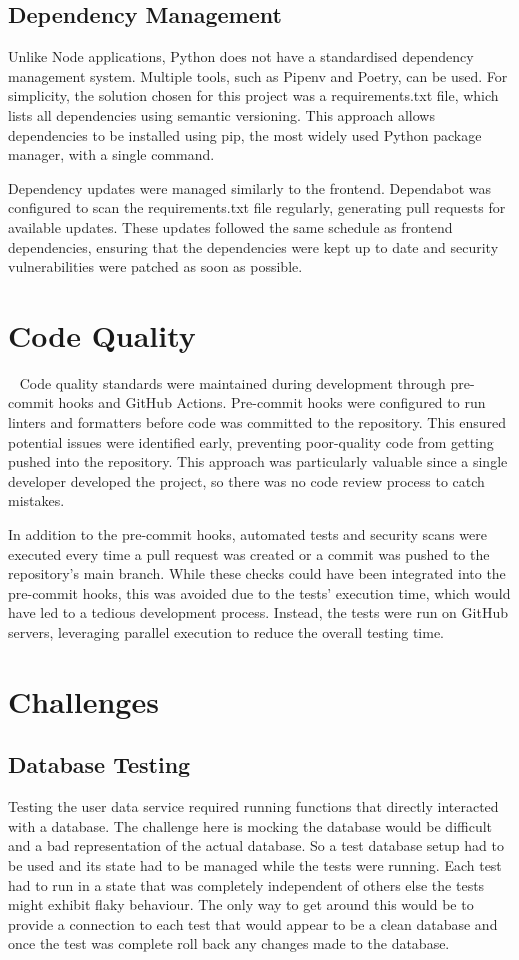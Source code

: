 \subsection{Dependency Management}
Unlike Node applications, Python does not have a standardised dependency management system. Multiple tools, such as Pipenv and Poetry, can be used. For simplicity, the solution chosen for this project was a requirements.txt file, which lists all dependencies using semantic versioning. This approach allows dependencies to be installed using pip, the most widely used Python package manager, with a single command.

Dependency updates were managed similarly to the frontend. Dependabot was configured to scan the requirements.txt file regularly, generating pull requests for available updates. These updates followed the same schedule as frontend dependencies, ensuring that the dependencies were kept up to date and security vulnerabilities were patched as soon as possible.

\section{Code Quality}~\label{sec:code-quality}
Code quality standards were maintained during development through pre-commit hooks and GitHub Actions. Pre-commit hooks were configured to run linters and formatters before code was committed to the repository. This ensured potential issues were identified early, preventing poor-quality code from getting pushed into the repository. This approach was particularly valuable since a single developer developed the project, so there was no code review process to catch mistakes.

In addition to the pre-commit hooks, automated tests and security scans were executed every time a pull request was created or a commit was pushed to the repository's main branch. While these checks could have been integrated into the pre-commit hooks, this was avoided due to the tests' execution time, which would have led to a tedious development process. Instead, the tests were run on GitHub servers, leveraging parallel execution to reduce the overall testing time.

\section{Challenges}
\subsection{Database Testing}
Testing the user data service required running functions that directly interacted with a database. The challenge here is mocking the database would be difficult and a bad representation of the actual database. So a test database setup had to be used and its state had to be managed while the tests were running. Each test had to run in a state that was completely independent of others else the tests might exhibit flaky behaviour. The only way to get around this would be to provide a connection to each test that would appear to be a clean database and once the test was complete roll back any changes made to the database.
